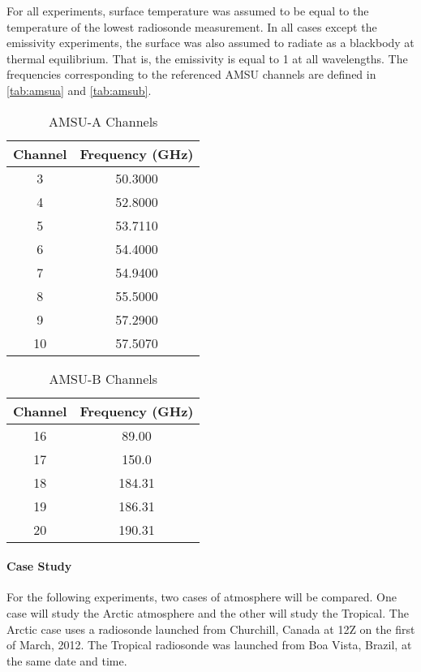 \documentclass[twocol]{ametsoc}
\begin{document}
For all experiments, surface temperature was assumed to be equal to the temperature of the lowest radiosonde measurement.
In all cases except the emissivity experiments, the surface was also assumed to radiate as a blackbody at thermal equilibrium. That is, the emissivity is equal to 1 at all wavelengths.
The frequencies corresponding to the referenced AMSU channels are defined in \autoref{tab:amsua} and \autoref{tab:amsub}.

\begin{table}
	\centering
	\caption{AMSU-A Channels}
	\begin{tabular}{cc}
		\toprule
		Channel	& Frequency (GHz)\\
		\midrule
	    3 & 50.3000 \\
	    4 & 52.8000 \\
	    5 & 53.7110 \\
	    6 & 54.4000 \\
	    7 & 54.9400 \\
	    8 & 55.5000 \\
	    9 & 57.2900 \\
	    10 & 57.5070 \\
	    \bottomrule
	\end{tabular}
	\label{tab:amsua}
\end{table}

\begin{table}
	\centering
	\caption{AMSU-B Channels}
	\begin{tabular}{cc}
		\toprule
		Channel	& Frequency (GHz)\\
		\midrule
		16 & 89.00 \\
		17 & 150.0 \\
		18 & 184.31 \\
		19 & 186.31 \\
		20 & 190.31 \\
	    \bottomrule
	\end{tabular}
	\label{tab:amsub}
\end{table}

\paragraph*{Case Study} For the following experiments, two cases of atmosphere will be compared.
One case will study the Arctic atmosphere and the other will study the Tropical.
The Arctic case uses a radiosonde launched from Churchill, Canada at 12Z on the first of March, 2012.
The Tropical radiosonde was launched from Boa Vista, Brazil, at the same date and time.
\end{document}
